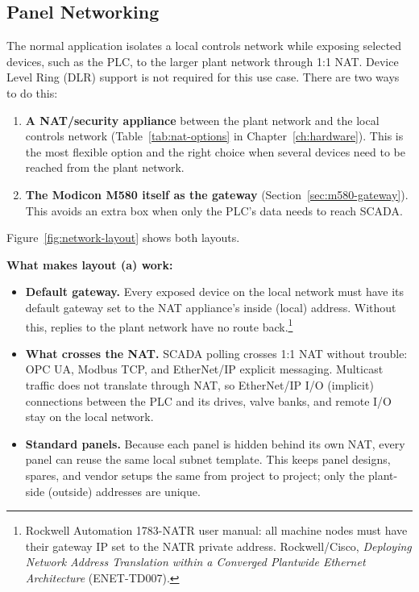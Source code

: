 \subsection{Panel Networking}\label{sec:panel-networking}
The normal application isolates a local controls network while exposing selected devices, such as the PLC, to the larger plant network through 1:1 NAT. Device Level Ring (DLR) support is not required for this use case. There are two ways to do this:
\begin{enumerate}[itemsep=2pt]
  \item \textbf{A NAT/security appliance} between the plant network and the local controls network (Table~\ref{tab:nat-options} in Chapter~\ref{ch:hardware}). This is the most flexible option and the right choice when several devices need to be reached from the plant network.
  \item \textbf{The Modicon M580 itself as the gateway} (Section~\ref{sec:m580-gateway}). This avoids an extra box when only the PLC's data needs to reach SCADA.
\end{enumerate}
Figure~\ref{fig:network-layout} shows both layouts.

\textbf{What makes layout (a) work:}
\begin{itemize}[itemsep=1pt]
  \item \textbf{Default gateway.} Every exposed device on the local network must have its default gateway set to the NAT appliance's inside (local) address. Without this, replies to the plant network have no route back.\footnote{Rockwell Automation 1783-NATR user manual: all machine nodes must have their gateway IP set to the NATR private address. Rockwell/Cisco, \emph{Deploying Network Address Translation within a Converged Plantwide Ethernet Architecture} (ENET-TD007).}
  \item \textbf{What crosses the NAT.} SCADA polling crosses 1:1 NAT without trouble: OPC UA, Modbus TCP, and EtherNet/IP explicit messaging. Multicast traffic does not translate through NAT, so EtherNet/IP I/O (implicit) connections between the PLC and its drives, valve banks, and remote I/O stay on the local network.
  \item \textbf{Standard panels.} Because each panel is hidden behind its own NAT, every panel can reuse the same local subnet template. This keeps panel designs, spares, and vendor setups the same from project to project; only the plant-side (outside) addresses are unique.
\end{itemize}

